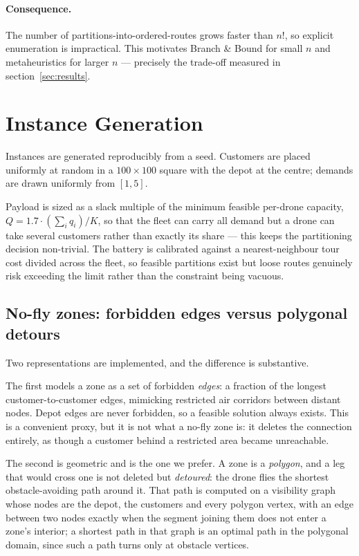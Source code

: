 \documentclass[11pt,a4paper]{article}
\begin{document}
\paragraph{Consequence.}
The number of partitions-into-ordered-routes grows faster than $n!$, so explicit
enumeration is impractical. This motivates Branch \& Bound for small $n$ and
metaheuristics for larger $n$ --- precisely the trade-off measured in section~\ref{sec:results}.

\section{Instance Generation}

Instances are generated reproducibly from a seed. Customers are placed uniformly
at random in a $100\times100$ square with the depot at the centre; demands are
drawn uniformly from $[1,5]$.

Payload is sized as a slack multiple of the minimum feasible per-drone capacity,
$Q = 1.7 \cdot (\sum_i q_i)/K$, so that the fleet can carry all demand but a
drone can take several customers rather than exactly its share --- this keeps the
partitioning decision non-trivial. The battery is calibrated against a
nearest-neighbour tour cost divided across the fleet, so feasible partitions exist
but loose routes genuinely risk exceeding the limit rather than the constraint
being vacuous.

\subsection{No-fly zones: forbidden edges versus polygonal detours}

Two representations are implemented, and the difference is substantive.

The first models a zone as a set of forbidden \emph{edges}: a fraction of the
longest customer-to-customer edges, mimicking restricted air corridors between
distant nodes. Depot edges are never forbidden, so a feasible solution always
exists. This is a convenient proxy, but it is not what a no-fly zone is: it
deletes the connection entirely, as though a customer behind a restricted area
became unreachable.

The second is geometric and is the one we prefer. A zone is a \emph{polygon}, and
a leg that would cross one is not deleted but \emph{detoured}: the drone flies
the shortest obstacle-avoiding path around it. That path is computed on a
visibility graph whose nodes are the depot, the customers and every polygon
vertex, with an edge between two nodes exactly when the segment joining them does
not enter a zone's interior; a shortest path in that graph is an optimal path in
the polygonal domain, since such a path turns only at obstacle vertices.
\end{document}
